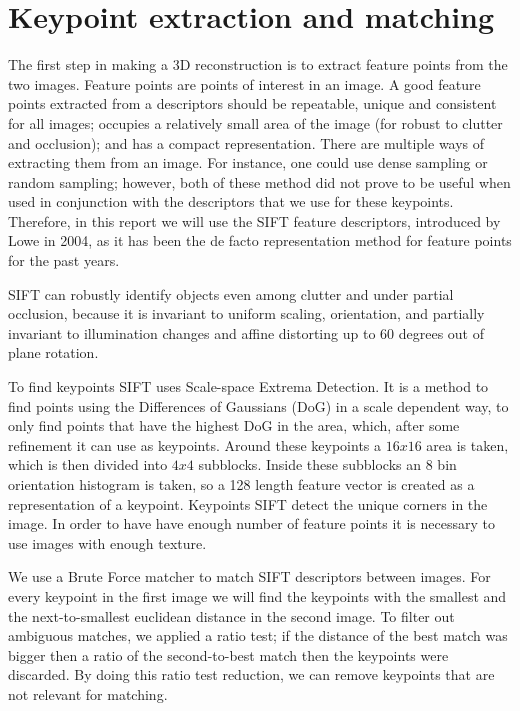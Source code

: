 \section{Keypoint extraction and matching}
\label{matching}
The first step in making a 3D reconstruction is to extract feature points from the two images.
Feature points are points of interest in an image.
A good feature points extracted from a descriptors should be repeatable, unique and consistent for all images;
occupies a relatively small area of the image (for robust to clutter and occlusion); and has a compact representation.
There are multiple ways of extracting them from an image.
For instance, one could use dense sampling \cite{DSIFT} or random sampling;
however, both of these method did not prove to be useful when used in conjunction with the descriptors that we use for these keypoints.
Therefore, in this report we will use the SIFT feature descriptors, introduced by Lowe\cite{SIFT} in 2004, as it has been the de facto representation method for feature points for the past years.

SIFT can robustly identify objects even among clutter and under partial occlusion, because it is invariant to uniform scaling, orientation, and partially invariant to illumination changes and affine distorting up to 60 degrees out of plane rotation.

To find keypoints SIFT uses Scale-space Extrema Detection.
It is a method to find points using the Differences of Gaussians (DoG) in a scale dependent way, to only find points that have the highest DoG in the area, which, after some refinement it can use as keypoints.
Around these keypoints a $16x16$ area is taken, which is then divided into $4x4$ subblocks.
Inside these subblocks an 8 bin orientation histogram is taken, so a 128 length feature vector is created as a representation of a keypoint.
Keypoints SIFT detect the unique corners in the image. 
In order to have have enough number of feature points it is necessary to use images with enough texture.

We use a Brute Force matcher to match SIFT descriptors between images. 
For every keypoint in the first image we will find the keypoints with the smallest and the next-to-smallest euclidean distance in the second image. 
To filter out ambiguous matches, we applied a ratio test; if the distance of the best match was bigger then a ratio of the second-to-best match then the keypoints were discarded.
By doing this ratio test reduction, we can remove keypoints that are not relevant for matching.

